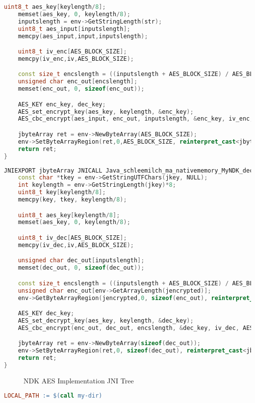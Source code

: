 \begin{appendices}
\begin{lstlisting}[language=C++, caption=AES Encrypt(), label=nkd_aes_encrypt]
    uint8_t aes_key[keylength/8];
    memset(aes_key, 0, keylength/8);
    inputslength = env->GetStringLength(str);
    uint8_t aes_input[inputslength];
    memcpy(aes_input,input,inputslength);

    uint8_t iv_enc[AES_BLOCK_SIZE];
    memcpy(iv_enc,iv,AES_BLOCK_SIZE);

    const size_t encslength = ((inputslength + AES_BLOCK_SIZE) / AES_BLOCK_SIZE) * AES_BLOCK_SIZE;
    unsigned char enc_out[encslength];
    memset(enc_out, 0, sizeof(enc_out));

    AES_KEY enc_key, dec_key;
    AES_set_encrypt_key(aes_key, keylength, &enc_key);
    AES_cbc_encrypt(aes_input, enc_out, inputslength, &enc_key, iv_enc, AES_ENCRYPT);

    jbyteArray ret = env->NewByteArray(AES_BLOCK_SIZE);
    env->SetByteArrayRegion(ret,0,AES_BLOCK_SIZE, reinterpret_cast<jbyte *>(enc_out));
    return ret;
}
\end{lstlisting}
\begin{lstlisting}[language=C++, caption=AES Decrypt(), label=nkd_aes_decrypt]
JNIEXPORT jbyteArray JNICALL Java_schleemilch_ma_nativememory_MyNDK_decrypt (JNIEnv *env, jobject obj, jbyteArray jencrypted, jstring jkey){
    const char *tkey = env->GetStringUTFChars(jkey, NULL);
    int keylength = env->GetStringLength(jkey)*8;
    uint8_t key[keylength/8];
    memcpy(key, tkey, keylength/8);

    uint8_t aes_key[keylength/8];
    memset(aes_key, 0, keylength/8);

    uint8_t iv_dec[AES_BLOCK_SIZE];
    memcpy(iv_dec,iv,AES_BLOCK_SIZE);

    unsigned char dec_out[inputslength];
    memset(dec_out, 0, sizeof(dec_out));

    const size_t encslength = ((inputslength + AES_BLOCK_SIZE) / AES_BLOCK_SIZE) * AES_BLOCK_SIZE;
    unsigned char enc_out[env->GetArrayLength(jencrypted)];
    env->GetByteArrayRegion(jencrypted,0, sizeof(enc_out), reinterpret_cast<jbyte*>(enc_out));

    AES_KEY dec_key;
    AES_set_decrypt_key(aes_key, keylength, &dec_key);
    AES_cbc_encrypt(enc_out, dec_out, encslength, &dec_key, iv_dec, AES_DECRYPT);

    jbyteArray ret = env->NewByteArray(sizeof(dec_out));
    env->SetByteArrayRegion(ret,0, sizeof(dec_out), reinterpret_cast<jbyte *>(dec_out));
    return ret;
}
\end{lstlisting}

\begin{figure}[htb]
\caption[NDK AES Implementation JNI Tree]{NDK AES Implementation JNI Tree}
\label{fig:ndk_aes_impl_tree}
\end{figure}
\begin{lstlisting}[language=make, caption=Memory/Android.mk, label=nkd_aes_make]
LOCAL_PATH := $(call my-dir)


\end{lstlisting}
\end{appendices}
